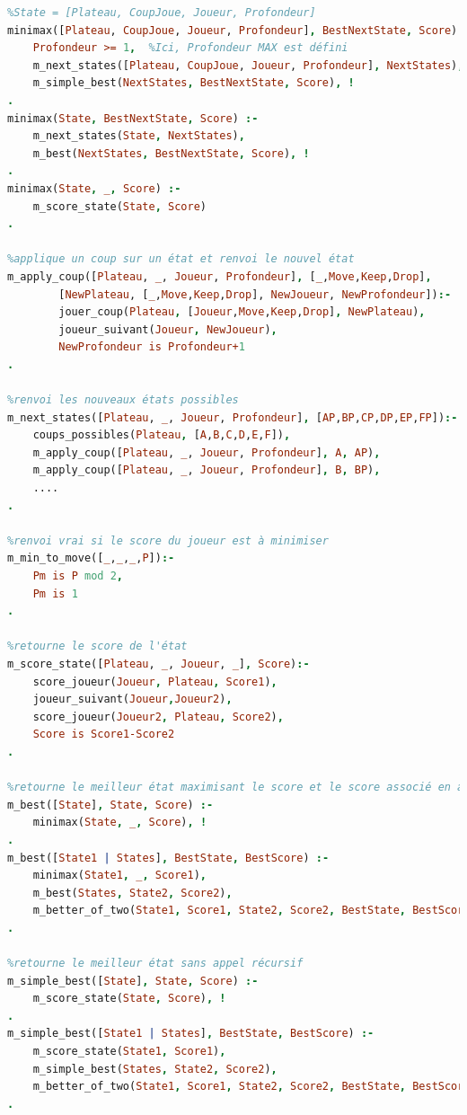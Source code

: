 \documentclass[11pt,a4paper,twoside,french,svgnames]{report}
\begin{document}
\begin{lstlisting}[language=prolog]
%Pour un état donné, retourne le meilleur coup minimax
%State = [Plateau, CoupJoue, Joueur, Profondeur]
minimax([Plateau, CoupJoue, Joueur, Profondeur], BestNextState, Score) :-
    Profondeur >= 1,  %Ici, Profondeur MAX est défini
    m_next_states([Plateau, CoupJoue, Joueur, Profondeur], NextStates),
    m_simple_best(NextStates, BestNextState, Score), !
.
minimax(State, BestNextState, Score) :-
    m_next_states(State, NextStates),
    m_best(NextStates, BestNextState, Score), !
.
minimax(State, _, Score) :-
    m_score_state(State, Score)
.

%applique un coup sur un état et renvoi le nouvel état
m_apply_coup([Plateau, _, Joueur, Profondeur], [_,Move,Keep,Drop],
        [NewPlateau, [_,Move,Keep,Drop], NewJoueur, NewProfondeur]):-
        jouer_coup(Plateau, [Joueur,Move,Keep,Drop], NewPlateau),
        joueur_suivant(Joueur, NewJoueur),
        NewProfondeur is Profondeur+1
.

%renvoi les nouveaux états possibles
m_next_states([Plateau, _, Joueur, Profondeur], [AP,BP,CP,DP,EP,FP]):-
    coups_possibles(Plateau, [A,B,C,D,E,F]),
    m_apply_coup([Plateau, _, Joueur, Profondeur], A, AP),
    m_apply_coup([Plateau, _, Joueur, Profondeur], B, BP),
    ....
.

%renvoi vrai si le score du joueur est à minimiser
m_min_to_move([_,_,_,P]):-
    Pm is P mod 2,
    Pm is 1
.

%retourne le score de l'état
m_score_state([Plateau, _, Joueur, _], Score):-
    score_joueur(Joueur, Plateau, Score1),
    joueur_suivant(Joueur,Joueur2),
    score_joueur(Joueur2, Plateau, Score2),
    Score is Score1-Score2
.

%retourne le meilleur état maximisant le score et le score associé en appelant récursivement minimax
m_best([State], State, Score) :-
    minimax(State, _, Score), !
.
m_best([State1 | States], BestState, BestScore) :-
    minimax(State1, _, Score1),
    m_best(States, State2, Score2),
    m_better_of_two(State1, Score1, State2, Score2, BestState, BestScore)
.

%retourne le meilleur état sans appel récursif
m_simple_best([State], State, Score) :-
    m_score_state(State, Score), !
.
m_simple_best([State1 | States], BestState, BestScore) :-
    m_score_state(State1, Score1),
    m_simple_best(States, State2, Score2),
    m_better_of_two(State1, Score1, State2, Score2, BestState, BestScore)
.
\end{lstlisting}
\end{document}
